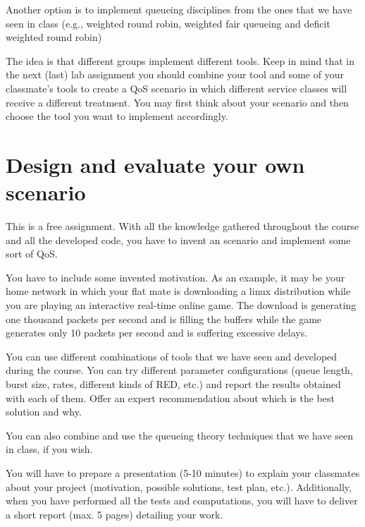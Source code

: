 Another option is to implement queueing disciplines from the ones that we have seen in class (e.g., weighted round robin, weighted fair queueing and deficit weighted round robin)

The idea is that different groups implement different tools.
Keep in mind that in the next (last) lab assignment you should combine your tool and some of your classmate's tools to create a QoS scenario in which different service classes will receive a different treatment.
You may first think about your scenario and then choose the tool you want to implement accordingly.


\section{Design and evaluate your own scenario}

This is a free assignment.
With all the knowledge gathered throughout the course and all the developed code, you have to invent an scenario and implement some sort of QoS.

You have to include some invented motivation.
As an example, it may be your home network in which your flat mate is downloading a linux distribution while you are playing an interactive real-time online game.
The download is generating one thousand packets per second and is filling the buffers while the game generates only 10 packets per second and is suffering excessive delays.

You can use different combinations of tools that we have seen and developed during the course.
You can try different parameter configurations (queue length, burst size, rates, different kinds of RED, etc.) and report the results obtained with each of them.
Offer an expert recommendation about which is the best solution and why.

You can also combine and use the queueing theory techniques that we have seen in class, if you wish.

You will have to prepare a presentation (5-10 minutes) to explain your classmates about your project (motivation, possible solutions, test plan, etc.).
Additionally, when you have performed all the tests and computations, you will have to deliver a short report (max. 5 pages) detailing your work.

